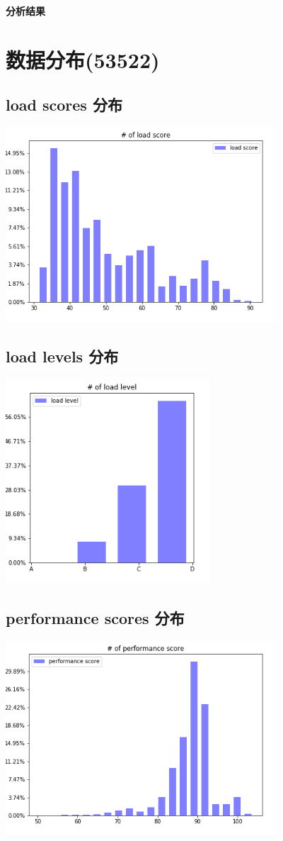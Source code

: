 \documentclass[a4paper,UTF8]{article}
\theoremstyle{definition}
\begin{document}
{\flushleft \bf \LARGE 分析结果} 

\section*{数据分布(53522)}
\subsection*{load scores 分布}
\includegraphics[width=4in]{histograph_of_load_scores.png}
\subsection*{load levels 分布}
\includegraphics[width=3in]{histograph_of_load_levels.png}
\subsection*{performance scores 分布}
\includegraphics[width=4in]{histograph_of_perf_scores.png}
\end{document}
